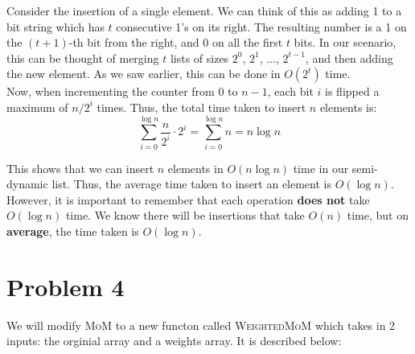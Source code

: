 \documentclass[a4paper]{article}
\begin{document}
\noindent Consider the insertion of a single element. We can think of this as adding 1 to a bit string which has $t$ consecutive 1's on its right. The resulting number is a 1 on the $(t + 1)$-th bit from the right, and 0 on all the first $t$ bits. In our scenario, this can be thought of merging $t$ lists of sizes $2^0$, $2^1$, ..., $2^{t-1}$, and then adding the new element. As we saw earlier, this can be done in $O(2^t)$ time. \\

\noindent Now, when incrementing the counter from 0 to $n - 1$, each bit $i$ is flipped a maximum of $n/2^i$ times. Thus, the total time taken to insert $n$ elements is:
\[
\sum_{i=0}^{\log n} \frac{n}{2^i} \cdot 2^i = \sum_{i=0}^{\log n} n = n \log n
\]

\noindent This shows that we can insert $n$ elements in $O(n \log n)$ time in our semi-dynamic list. Thus, the average time taken to insert an element is $O(\log n)$. However, it is important to remember that each operation \textbf{does not} take $O(\log n)$ time. We know there will be insertions that take $O(n)$ time, but on \textbf{average}, the time taken is $O(\log n)$.


\newpage
\section*{Problem 4}

We will modify \textsc{MoM} to a new functon called \textsc{WeightedMoM} which takes in 2 inputs: the orginial array and a weights array. It is described below:
\end{document}
